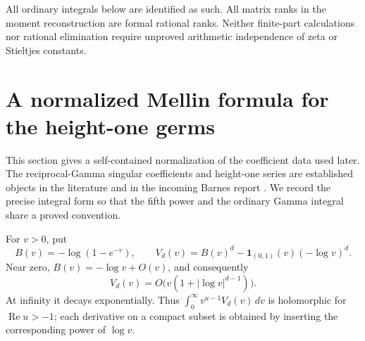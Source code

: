 \documentclass[11pt,a4paper]{article}
\numberwithin{equation}{section}
\theoremstyle{definition}
\newcommand{\re}{\operatorname{Re}}
\begin{document}
All ordinary integrals below are identified as such. All matrix ranks
in the moment reconstruction are formal rational ranks. Neither
finite-part calculations nor rational elimination require unproved
arithmetic independence of zeta or Stieltjes constants.


\section{A normalized Mellin formula for the height-one germs}
\label{sec:laurent}

This section gives a self-contained normalization of the coefficient
data used later. The reciprocal-Gamma singular coefficients and
height-one series are established objects in the literature
\cite{Young2023,Young2024} and in the incoming Barnes report
\cite{Barnes}. We record the precise integral form so that the fifth
power and the ordinary Gamma integral share a proved convention.

For $v>0$, put
\begin{equation}\label{eq:Vdef}
 B(v)=-\log(1-e^{-v}),\qquad
 V_d(v)=B(v)^d-\boldsymbol1_{(0,1)}(v)(-\log v)^d.
\end{equation}
Near zero, $B(v)=-\log v+O(v)$, and consequently
\[
 V_d(v)=O\bigl(v(1+|\log v|^{d-1})\bigr).
\]
At infinity it decays exponentially. Thus
$\int_0^\infty v^{u-1}V_d(v)\,dv$ is holomorphic for
$\re u>-1$; each derivative on a compact subset is obtained by
inserting the corresponding power of $\log v$.
\end{document}
